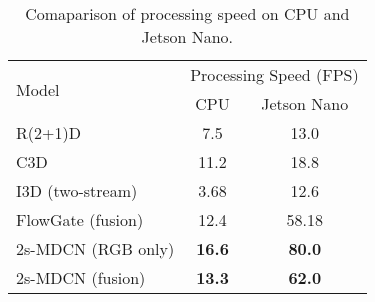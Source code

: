 \begin{table}[htb]
\begin{center}
\begin{tabular}{lcc}
\hline
\multicolumn{1}{l}{\multirow{2}{*}{Model}} & \multicolumn{2}{l}{Processing Speed (FPS)} \\\cline{2-3}
\multicolumn{1}{c}{}                       & \multicolumn{1}{c}{CPU} & \multicolumn{1}{c}{Jetson Nano} \\\hline
R(2+1)D~\cite{r21dtran2018closer}                                    & 7.5                     & 13.0                   \\
C3D~\cite{c3dtran2015learning}                                        & 11.2                    & 18.8                   \\
I3D (two-stream)~\cite{i3dcarreira2017quo}                           & 3.68                    & 12.6                   \\
FlowGate (fusion)~\cite{cheng2019rwf}                          & 12.4            & 58.18                  \\ \hline
2s-MDCN (RGB only)                                & \textbf{16.6}                    & \textbf{80.0} \\
2s-MDCN (fusion)                                & \textbf{13.3}                    & \textbf{62.0} \\\hline                
\end{tabular}
\caption{Comaparison of processing speed on CPU and Jetson Nano.}
\label{tab:mdcn_fps}
\end{center}
\end{table}